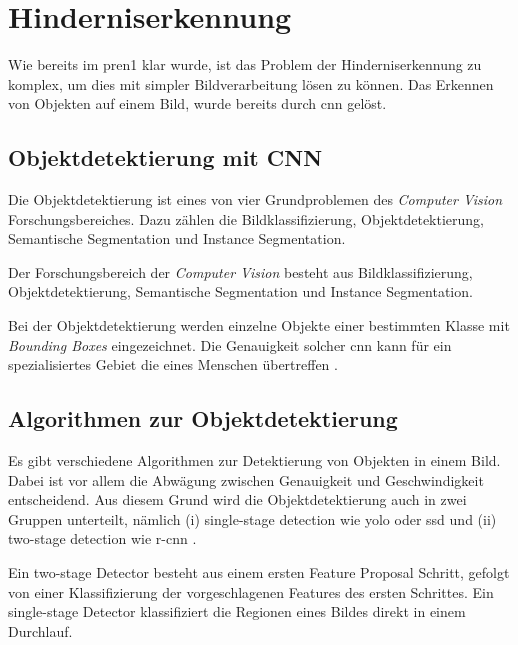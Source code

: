 \newpage

\section{Hinderniserkennung}

Wie bereits im \acrshort{pren1} klar wurde, ist das Problem der Hinderniserkennung zu komplex, um dies mit simpler Bildverarbeitung lösen zu können. 
Das Erkennen von Objekten auf einem Bild, wurde bereits durch \acrfull{cnn} gelöst.

\subsection{Objektdetektierung mit CNN}

Die Objektdetektierung ist eines von vier Grundproblemen des {\it Computer Vision} Forschungsbereiches.
Dazu zählen die Bildklassifizierung, Objektdetektierung, Semantische Segmentation und Instance Segmentation.

{
Der Forschungsbereich der {\it Computer Vision} \cite{wu2019recent} besteht aus Bildklassifizierung, 
Objektdetektierung, Semantische Segmentation und Instance Segmentation.
}

\newpage

Bei der Objektdetektierung werden einzelne Objekte einer bestimmten Klasse mit {\it Bounding Boxes}
eingezeichnet. Die Genauigkeit solcher \acrshort{cnn} kann für ein spezialisiertes Gebiet die
eines Menschen übertreffen \cite{BUETTIDINH2019e00321}.

\subsection{Algorithmen zur Objektdetektierung}

Es gibt verschiedene Algorithmen zur Detektierung von Objekten in einem Bild. 
Dabei ist vor allem die Abwägung zwischen Genauigkeit und Geschwindigkeit entscheidend.
Aus diesem Grund wird die Objektdetektierung auch in zwei Gruppen unterteilt, nämlich 
(i) single-stage detection wie \acrshort{yolo} \cite{redmon2016look} oder \acrshort{ssd} \cite{Liu_2016} und (ii) two-stage detection wie \acrfull{r-cnn} \cite{girshick2015fast}.

Ein two-stage Detector besteht aus einem ersten Feature Proposal Schritt, gefolgt von einer Klassifizierung der vorgeschlagenen Features des ersten Schrittes. Ein single-stage Detector klassifiziert die Regionen eines Bildes direkt in einem Durchlauf. 

